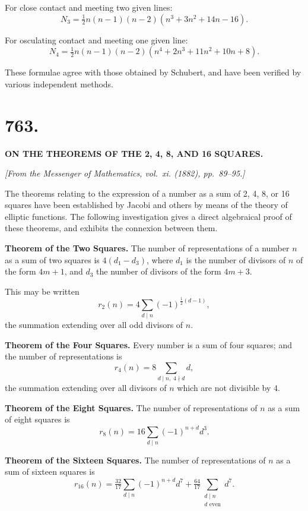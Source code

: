 \documentclass[12pt,a4paper]{article}
\begin{document}
For close contact and meeting two given lines:
%
\[
N_3 = \tfrac{1}{2} n(n-1)(n-2)(n^3 + 3n^2 + 14n - 16).
\]

For osculating contact and meeting one given line:
%
\[
N_4 = \tfrac{1}{2} n(n-1)(n-2)(n^4 + 2n^3 + 11n^2 + 10n + 8).
\]

These formulae agree with those obtained by Schubert, and have been
verified by various independent methods.

\newpage


\section*{763.}

\begin{center}
\textbf{ON THE THEOREMS OF THE 2, 4, 8, AND 16 SQUARES.}
\end{center}

\begin{flushright}
\textit{[From the Messenger of Mathematics, vol.~xi. (1882), pp.~89--95.]}
\end{flushright}

The theorems relating to the expression of a number as a sum of 2, 4, 8,
or 16 squares have been established by Jacobi and others by means of
the theory of elliptic functions. The following investigation gives a direct
algebraical proof of these theorems, and exhibits the connexion between
them.

\textbf{Theorem of the Two Squares.} The number of representations of a number
$n$ as a sum of two squares is $4(d_1 - d_3)$, where $d_1$ is the number of divisors
of $n$ of the form $4m+1$, and $d_3$ the number of divisors of the form $4m+3$.

This may be written
%
\[
r_2(n) = 4 \sum_{d \mid n} (-1)^{\frac{1}{2}(d-1)},
\]
%
the summation extending over all odd divisors of $n$.

\textbf{Theorem of the Four Squares.} Every number is a sum of four squares;
and the number of representations is
%
\[
r_4(n) = 8 \sum_{d \mid n,\; 4 \nmid d} d,
\]
%
the summation extending over all divisors of $n$ which are not divisible
by $4$.

\textbf{Theorem of the Eight Squares.} The number of representations of $n$ as
a sum of eight squares is
%
\[
r_8(n) = 16 \sum_{d \mid n} (-1)^{n+d} d^3.
\]

\textbf{Theorem of the Sixteen Squares.} The number of representations of $n$ as
a sum of sixteen squares is
%
\[
r_{16}(n) = \tfrac{32}{17} \sum_{d \mid n} (-1)^{n+d} d^7
+ \tfrac{64}{17} \sum_{\substack{d \mid n \\ d \text{ even}}} d^7.
\]
\end{document}
